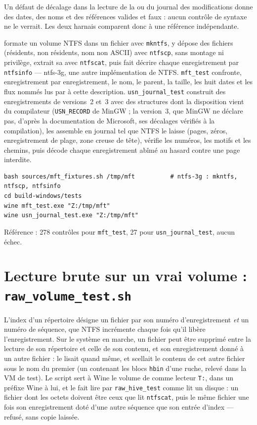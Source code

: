 \documentclass[11pt,a4paper,oneside]{report}
\begin{document}
Un défaut de décalage dans la lecture de la  ou du journal
des modifications donne des dates, des noms et des références valides et
faux : aucun contrôle de syntaxe ne le verrait. Les deux harnais comparent donc
\wac{} à une référence indépendante.

 formate un volume NTFS dans un fichier avec
\texttt{mkntfs}, y dépose des fichiers (résidents, non résidents, nom non
ASCII) avec \texttt{ntfscp}, sans montage ni privilège, extrait sa
 avec \texttt{ntfscat}, puis fait décrire chaque enregistrement
par \texttt{ntfsinfo} — ntfs-3g, une autre implémentation de NTFS.
\texttt{mft\_test} confronte, enregistrement par enregistrement, le nom, le
parent, la taille, les huit dates et les flux nommés lus par \wac{} à cette
description. \texttt{usn\_journal\_test} construit des enregistrements de
versions~2 et~3 avec des structures dont la disposition vient du compilateur
(\texttt{USN\_RECORD} de MinGW ; la version~3, que MinGW ne déclare pas,
d'après la documentation de Microsoft, ses décalages vérifiés à la
compilation), les assemble en journal tel que NTFS le laisse (pages, zéros,
enregistrement de plage, zone creuse de tête), vérifie les numéros, les motifs
et les chemins, puis décode chaque enregistrement abîmé au hasard contre une
page interdite.

\begin{lstlisting}
bash sources/mft_fixtures.sh /tmp/mft          # ntfs-3g : mkntfs, ntfscp, ntfsinfo
cd build-windows/tests
wine mft_test.exe "Z:/tmp/mft"
wine usn_journal_test.exe "Z:/tmp/mft"
\end{lstlisting}

Référence : 278 contrôles pour \texttt{mft\_test}, 27 pour
\texttt{usn\_journal\_test}, aucun échec.

\section{Lecture brute sur un vrai volume : \texttt{raw\_volume\_test.sh}}

L'index d'un répertoire désigne un fichier par son numéro d'enregistrement
\emph{et} un numéro de séquence, que NTFS incrémente chaque fois qu'il libère
l'enregistrement. Sur le système en marche, un fichier peut être supprimé entre
la lecture de son répertoire et celle de son contenu, et son enregistrement
donné à un autre fichier : \wac{} le lisait quand même, et scellait le contenu
de cet autre fichier sous le nom du premier (un  contenant
les blocs \texttt{hbin} d'une ruche, relevé dans la VM de test). Le script
sert à Wine le volume de  comme lecteur
\texttt{T:}, dans un préfixe Wine à lui, et le fait lire par
\texttt{raw\_hive\_test} comme \wac{} lit un disque : un fichier dont les
octets doivent être ceux que lit \texttt{ntfscat}, puis le même fichier une
fois son enregistrement doté d'une autre séquence que son entrée d'index —
refusé, sans copie laissée.
\end{document}
